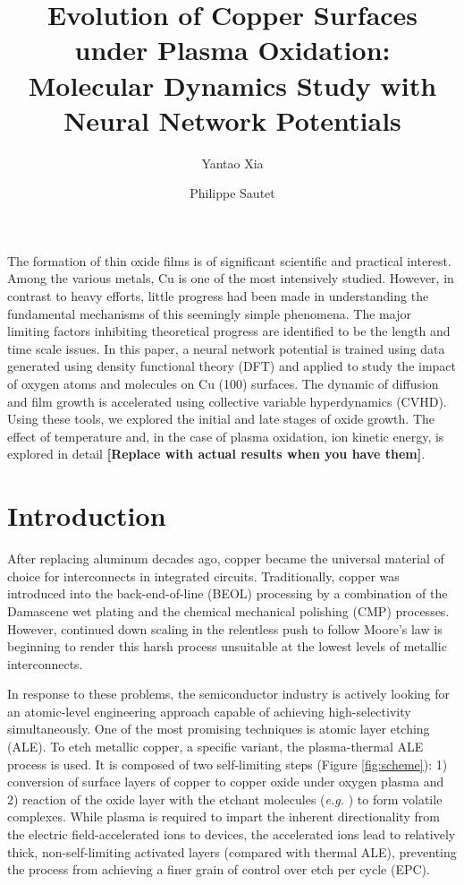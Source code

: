 \documentclass[manuscript=cmatex]{achemso}
\title          {Evolution of Copper Surfaces under Plasma Oxidation: Molecular Dynamics Study with Neural Network Potentials}
\author         {Yantao Xia}
\affiliation    {Department of Chemical and Biomolecular Engineering, University of California, Los Angeles, CA 90095, USA}
\author         {Philippe Sautet}
\affiliation    {Department of Chemical and Biomolecular Engineering, University of California, Los Angeles, CA 90095, USA}
\begin{document}
\abstract
The formation of thin oxide films is of significant scientific and practical interest. Among the various metals, Cu is one of the most intensively studied. However, in contrast to heavy efforts, little progress had been made in understanding the fundamental mechanisms of this seemingly simple phenomena. The major limiting factors inhibiting theoretical progress are identified to be the length and time scale issues. In this paper, a neural network potential is trained using data generated using density functional theory (DFT) and applied to study the impact of oxygen atoms and molecules on Cu (100) surfaces. The dynamic of diffusion and film growth is accelerated using collective variable hyperdynamics (CVHD). Using these tools, we explored the initial and late stages of oxide growth. The effect of temperature and, in the case of plasma oxidation, ion kinetic energy, is explored in detail \textbf{[Replace with actual results when you have them]}.

\section{Introduction}
\label{sec:intro}

After replacing aluminum decades ago, copper became the universal material of choice for interconnects in integrated circuits. Traditionally, copper was introduced into the back-end-of-line (BEOL) processing by a combination of the Damascene wet plating and the chemical mechanical polishing (CMP) processes. However, continued down scaling in the relentless push to follow Moore's law is beginning to render this harsh process unsuitable at the lowest levels of metallic interconnects. 

In response to these problems, the semiconductor industry is actively looking for an atomic-level engineering approach capable of achieving high-selectivity simultaneously. One of the most promising techniques is atomic layer etching (ALE). To etch metallic copper, a specific variant, the plasma-thermal ALE process is used. It is composed of two self-limiting steps (Figure \ref{fig:scheme}): 1) conversion of surface layers of copper to copper oxide under oxygen plasma and 2) reaction of the oxide layer with the etchant molecules (\textit{e.g.} ) to form volatile complexes. While plasma is required to impart the inherent directionality from the electric field-accelerated ions to devices, the accelerated ions lead to relatively thick, non-self-limiting activated layers (compared with thermal ALE), preventing the process from achieving a finer grain of control over etch per cycle (EPC). 
\end{document}
